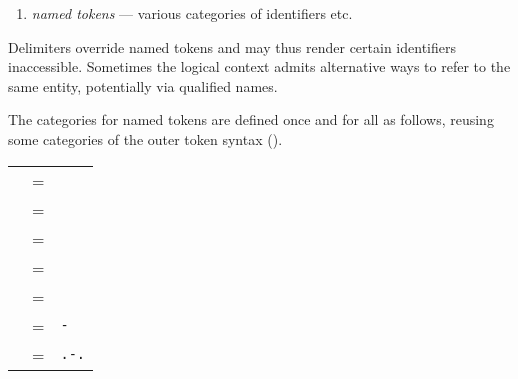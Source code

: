 \begin{isabellebody}
\begin{isamarkuptext}
\begin{enumerate}
  \item \emph{named tokens} --- various categories of identifiers etc.

  \end{enumerate}

  Delimiters override named tokens and may thus render certain
  identifiers inaccessible.  Sometimes the logical context admits
  alternative ways to refer to the same entity, potentially via
  qualified names.

  \medskip The categories for named tokens are defined once and for
  all as follows, reusing some categories of the outer token syntax
  ().

  \begin{center}
  \begin{supertabular}{rcl}
    \hypertarget{syntax.inner.id}{\hyperlink{syntax.inner.id}{\mbox{}}} & = & \hyperlink{syntax.ident}{\mbox{}} \\
    \hypertarget{syntax.inner.longid}{\hyperlink{syntax.inner.longid}{\mbox{}}} & = & \hyperlink{syntax.longident}{\mbox{}} \\
    \hypertarget{syntax.inner.var}{\hyperlink{syntax.inner.var}{\mbox{}}} & = & \hyperlink{syntax.var}{\mbox{}} \\
    \hypertarget{syntax.inner.tid}{\hyperlink{syntax.inner.tid}{\mbox{}}} & = & \hyperlink{syntax.typefree}{\mbox{}} \\
    \hypertarget{syntax.inner.tvar}{\hyperlink{syntax.inner.tvar}{\mbox{}}} & = & \hyperlink{syntax.typevar}{\mbox{}} \\
    \hypertarget{syntax.inner.num-token}{\hyperlink{syntax.inner.num-token}{\mbox{}}} & = & \hyperlink{syntax.nat}{\mbox{}}\verb|-|\hyperlink{syntax.nat}{\mbox{}} \\
    \hypertarget{syntax.inner.float-token}{\hyperlink{syntax.inner.float-token}{\mbox{}}} & = & \hyperlink{syntax.nat}{\mbox{}}\verb|.|\hyperlink{syntax.nat}{\mbox{}}\verb|-|\hyperlink{syntax.nat}{\mbox{}}\verb|.|\hyperlink{syntax.nat}{\mbox{}} \\

\end{supertabular}
\end{center}
\end{isamarkuptext}
\end{isabellebody}
